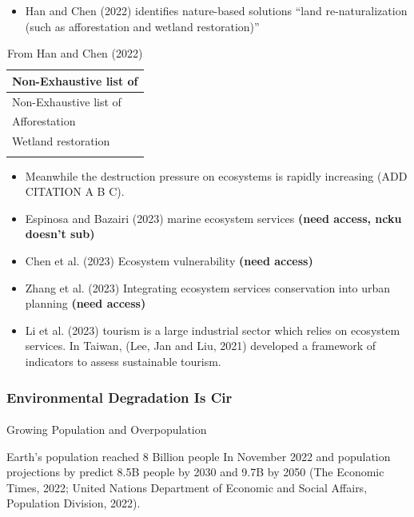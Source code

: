 \documentclass[
  letterpaper,
  DIV=11,
  numbers=noendperiod]{scrartcl}
\makeatletter
\let\oldparagraph\paragraph
\renewcommand{\paragraph}{
    \@ifstar
      \xxxParagraphStar
      \xxxParagraphNoStar
  }
\newcommand{\xxxParagraphStar}[1]{\oldparagraph*{#1}\mbox{}}
\newcommand{\xxxParagraphNoStar}[1]{\oldparagraph{#1}\mbox{}}
\providecommand{\tightlist}{%
  \setlength{\itemsep}{0pt}\setlength{\parskip}{0pt}}\usepackage{longtable,booktabs,array}
\makeatother
\begin{document}
\begin{itemize}
\tightlist
\item
  Han and Chen (2022) identifies nature-based solutions ``land
  re-naturalization (such as afforestation and wetland restoration)''
\end{itemize}

\begin{longtable}[]{@{}l@{}}
\caption{From Han and Chen (2022)}\tabularnewline
\toprule\noalign{}
Non-Exhaustive list of \\
\midrule\noalign{}
\endfirsthead
\toprule\noalign{}
Non-Exhaustive list of \\
\midrule\noalign{}
\endhead
\bottomrule\noalign{}
\endlastfoot
Afforestation \\
Wetland restoration \\
 \\
\end{longtable}

\begin{itemize}
\item
  Meanwhile the destruction pressure on ecosystems is rapidly increasing
  (ADD CITATION A B C).
\item
  Espinosa and Bazairi (2023) marine ecosystem services \textbf{(need
  access, ncku doesn't sub)}
\item
  Chen et al. (2023) Ecosystem vulnerability \textbf{(need access)}
\item
  Zhang et al. (2023) Integrating ecosystem services conservation into
  urban planning \textbf{(need access)}
\item
  Li et al. (2023) tourism is a large industrial sector which relies on
  ecosystem services. In Taiwan, (Lee, Jan and Liu, 2021) developed a
  framework of indicators to assess sustainable tourism.
\end{itemize}

\subsubsection{\texorpdfstring{\textbf{Environmental Degradation Is
Cir}}{Environmental Degradation Is Cir}}\label{environmental-degradation-is-cir}

\paragraph{Growing Population and
Overpopulation}\label{growing-population-and-overpopulation}

Earth's population reached 8 Billion people In November 2022 and
population projections by predict 8.5B people by 2030 and 9.7B by 2050
(The Economic Times, 2022; United Nations Department of Economic and
Social Affairs, Population Division, 2022).
\end{document}
